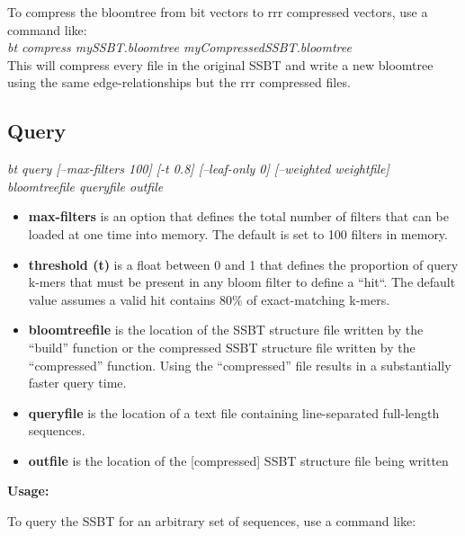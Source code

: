 \documentclass{article}
\begin{document}
To compress the bloomtree from bit vectors to rrr compressed vectors, use a command like: \\

\textit{bt compress mySSBT.bloomtree myCompressedSSBT.bloomtree} \\

This will compress every file in the original SSBT and write a new bloomtree using the same edge-relationships but the rrr compressed files.


\subsection{Query}
\textit{bt query [--max-filters 100] [-t 0.8] [--leaf-only 0] [--weighted weightfile] bloomtreefile queryfile outfile}
\begin{itemize}
\item \textbf{max-filters} is an option that defines the total number of filters that can be loaded at one time into memory. The default is set to 100 filters in memory. 
\item \textbf{threshold (t)} is a float between 0 and 1 that defines the proportion of query k-mers that must be present in any bloom filter to define a ``hit``. The default value assumes a valid hit contains 80\% of exact-matching k-mers.
\item \textbf{bloomtreefile} is the location of the SSBT structure file written by the ``build'' function or the compressed SSBT structure file written by the ``compressed'' function. Using the ``compressed'' file results in a substantially faster query time.
\item \textbf{queryfile} is the location of a text file containing line-separated full-length sequences.
\item \textbf{outfile} is the location of the [compressed] SSBT structure file being written
\end{itemize}
\textbf{Usage:}

To query the SSBT for an arbitrary set of sequences, use a command like: \\
\end{document}
